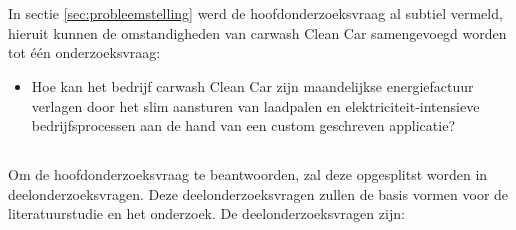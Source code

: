 \section{}%
\label{sec:onderzoeksvraag}

\subsection{}
\label{subsec:hoofdonderzoeksvraag}

In sectie \ref{sec:probleemstelling} werd de hoofdonderzoeksvraag al subtiel vermeld, hieruit kunnen de omstandigheden van carwash Clean Car samengevoegd worden tot één onderzoeksvraag:

\begin{itemize}
  \item Hoe kan het bedrijf carwash Clean Car zijn maandelijkse energiefactuur verlagen door het slim aansturen van laadpalen en elektriciteit-intensieve bedrijfsprocessen aan de hand van een custom geschreven applicatie?
\end{itemize}

\pagebreak

\subsection{}
\label{subsec:deelonderzoeksvragen}

Om de hoofdonderzoeksvraag te beantwoorden, zal deze opgesplitst worden in deelonderzoeksvragen. Deze deelonderzoeksvragen zullen de basis vormen voor de literatuurstudie en het onderzoek. De deelonderzoeksvragen zijn:


